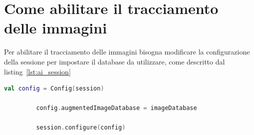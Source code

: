 \documentclass[crop=false, class=book]{standalone}
\begin{document}
	\section{Come abilitare il tracciamento delle immagini}
	Per abilitare il tracciamento delle immagini bisogna modificare la configurazione della sessione per impostare il database da utilizzare, come descritto dal listing~\vref{lst:ai_session}
	
	\begin{center}
		\begin{minipage}{0.95\textwidth}
		\begin{lstlisting}[caption={Descrizione del listing.}, label={lst:ai_session}, language=Kotlin]
		 val config = Config(session)
		
		 config.augmentedImageDatabase = imageDatabase
		
		 session.configure(config)
		\end{lstlisting}
		\end{minipage}
	\end{center}
\end{document}

